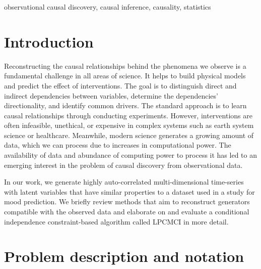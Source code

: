 \documentclass[conference]{IEEEtran}
\begin{document}
\begin{IEEEkeywords}
observational causal discovery, causal inference, causality, statistics
\end{IEEEkeywords}

\section{Introduction}
Reconstructing the causal relationships behind the phenomena we observe is a fundamental challenge in all areas of science. It helps to build physical models and predict the effect of interventions\cite{pearl_book_2018}.
The goal is to distinguish direct and indirect dependencies between variables, determine the dependencies' directionality, and identify common drivers.
The standard approach is to learn causal relationships through conducting experiments. However, interventions are often infeasible, unethical, or expensive in complex systems such as earth system science or healthcare\cite{mcelreath_statistical_2018}.
Meanwhile, modern science generates a growing amount of data, which we can process due to increases in computational power.
The availability of data and abundance of computing power to process it has led to an emerging interest in the problem of causal discovery from observational data\cite{runge_causal_2018}.

In our work, we generate highly auto-correlated multi-dimensional time-series with latent variables that have similar properties to a dataset used in a study for mood prediction\cite{reiser_predicting_2022}. We briefly review methods that aim to reconstruct generators compatible with the observed data and elaborate on and evaluate a conditional independence constraint-based algorithm called LPCMCI\cite{gerhardus_high-recall_2021} in more detail.


\section{Problem description and notation}
\end{document}
